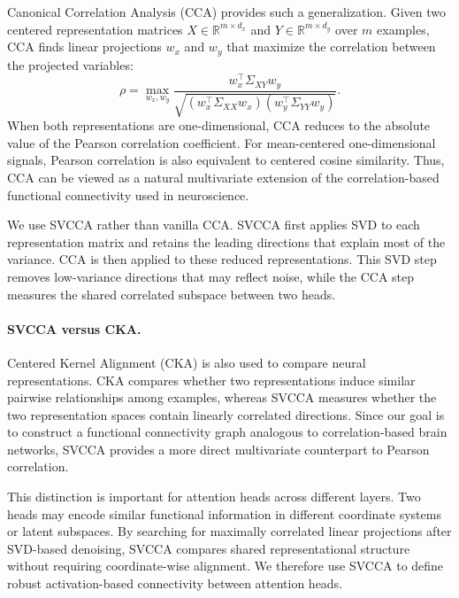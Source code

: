 Canonical Correlation Analysis (CCA) provides such a generalization. Given two centered representation matrices $X \in \mathbb{R}^{m \times d_x}$ and $Y \in \mathbb{R}^{m \times d_y}$ over $m$ examples, CCA finds linear projections $w_x$ and $w_y$ that maximize the correlation between the projected variables:
\[
\rho =
\max_{w_x,w_y}
\frac{
w_x^\top \Sigma_{XY} w_y
}{
\sqrt{
(w_x^\top \Sigma_{XX} w_x)
(w_y^\top \Sigma_{YY} w_y)
}
}.
\]
When both representations are one-dimensional, CCA reduces to the absolute value of the Pearson correlation coefficient. For mean-centered one-dimensional signals, Pearson correlation is also equivalent to centered cosine similarity. Thus, CCA can be viewed as a natural multivariate extension of the correlation-based functional connectivity used in neuroscience.

We use SVCCA \cite{raghu2017svcca} rather than vanilla CCA. SVCCA first applies SVD to each representation matrix and retains the leading directions that explain most of the variance. CCA is then applied to these reduced representations. This SVD step removes low-variance directions that may reflect noise, while the CCA step measures the shared correlated subspace between two heads.

\paragraph{SVCCA versus CKA.}
Centered Kernel Alignment (CKA) \cite{kornblith2019similarity} is also used to compare neural representations. CKA compares whether two representations induce similar pairwise relationships among examples, whereas SVCCA measures whether the two representation spaces contain linearly correlated directions. Since our goal is to construct a functional connectivity graph analogous to correlation-based brain networks, SVCCA provides a more direct multivariate counterpart to Pearson correlation.

This distinction is important for attention heads across different layers. Two heads may encode similar functional information in different coordinate systems or latent subspaces. By searching for maximally correlated linear projections after SVD-based denoising, SVCCA compares shared representational structure without requiring coordinate-wise alignment. We therefore use SVCCA to define robust activation-based connectivity between attention heads.


